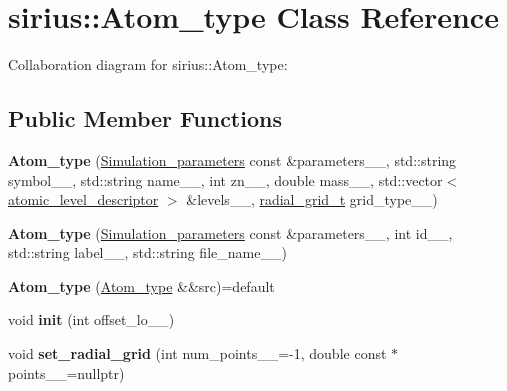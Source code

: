 \hypertarget{classsirius_1_1_atom__type}{}\section{sirius\+:\+:Atom\+\_\+type Class Reference}
\label{classsirius_1_1_atom__type}


Collaboration diagram for sirius\+:\+:Atom\+\_\+type\+:
\subsection*{Public Member Functions}
\begin{DoxyCompactItemize}
\item 
\hypertarget{classsirius_1_1_atom__type_a7fd43ecf32da563f6dd691cf384e7681}{}{\bfseries Atom\+\_\+type} (\hyperlink{classsirius_1_1_simulation__parameters}{Simulation\+\_\+parameters} const \&parameters\+\_\+\+\_\+, std\+::string symbol\+\_\+\+\_\+, std\+::string name\+\_\+\+\_\+, int zn\+\_\+\+\_\+, double mass\+\_\+\+\_\+, std\+::vector$<$ \hyperlink{structatomic__level__descriptor}{atomic\+\_\+level\+\_\+descriptor} $>$ \&levels\+\_\+\+\_\+, \hyperlink{namespacesirius_a9c2875496b6736959baaf053c21dafb0}{radial\+\_\+grid\+\_\+t} grid\+\_\+type\+\_\+\+\_\+)\label{classsirius_1_1_atom__type_a7fd43ecf32da563f6dd691cf384e7681}

\item 
\hypertarget{classsirius_1_1_atom__type_a738e381f76fbf3c7fb28fc4a38f58d2c}{}{\bfseries Atom\+\_\+type} (\hyperlink{classsirius_1_1_simulation__parameters}{Simulation\+\_\+parameters} const \&parameters\+\_\+\+\_\+, int id\+\_\+\+\_\+, std\+::string label\+\_\+\+\_\+, std\+::string file\+\_\+name\+\_\+\+\_\+)\label{classsirius_1_1_atom__type_a738e381f76fbf3c7fb28fc4a38f58d2c}

\item 
\hypertarget{classsirius_1_1_atom__type_a5a42ff00fe1842cab5d838cf565cbb0f}{}{\bfseries Atom\+\_\+type} (\hyperlink{classsirius_1_1_atom__type}{Atom\+\_\+type} \&\&src)=default\label{classsirius_1_1_atom__type_a5a42ff00fe1842cab5d838cf565cbb0f}

\item 
\hypertarget{classsirius_1_1_atom__type_a5415f97bef517ffbeae2e2521395558e}{}void {\bfseries init} (int offset\+\_\+lo\+\_\+\+\_\+)\label{classsirius_1_1_atom__type_a5415f97bef517ffbeae2e2521395558e}

\item 
\hypertarget{classsirius_1_1_atom__type_afb60fd5bd4792a046e6f204b20eb37b5}{}void {\bfseries set\+\_\+radial\+\_\+grid} (int num\+\_\+points\+\_\+\+\_\+=-\/1, double const $\ast$points\+\_\+\+\_\+=nullptr)\label{classsirius_1_1_atom__type_afb60fd5bd4792a046e6f204b20eb37b5}


\end{DoxyCompactItemize}
